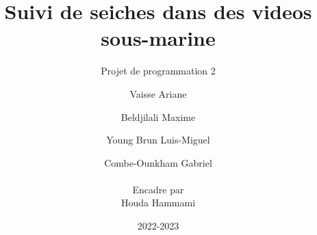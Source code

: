 \documentclass[12pt, a4paper, draft]{scrbook}
\title{ Suivi de seiches dans des videos sous-marine}
\subtitle{Projet de programmation 2 }         %
\author{ Vaisse Ariane \and Beldjilali Maxime \and Young Brun Luis-Miguel \and Combe-Ounkham Gabriel \\ \\
		\small{Encadre par} \\ \small{Houda Hammami}}
\date{2022-2023}
\begin{document}
\maketitle



\tableofcontents \clearpage

\listoffigures \clearpage
















\cite{xu_human_2010}
\cite{kong_particle_2019}
\cite{qiang_zhu_fast_2006}
\cite{dalal_histograms_2005}
\cite{bhattacharyya_measure_1960}
\cite{rlabbe}
\cite{wang_yolov7_nodate}

\printbibliography


\end{document}
